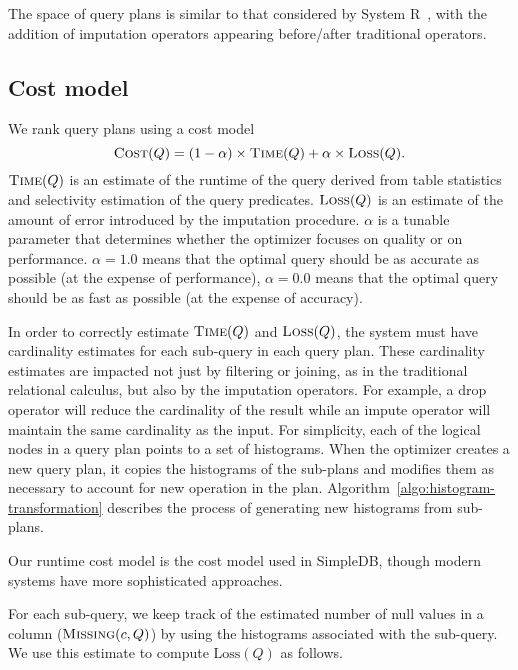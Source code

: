 The space of query plans is similar to that considered by System R~\cite{blasgen1981system}, with the addition of imputation operators appearing before/after traditional operators.

\subsection{Cost model}
\label{sec:cost-model}
We rank query plans using a cost model \[\textsc{Cost}(Q) = (1 - \alpha) \times \textsc{Time}(Q) + \alpha \times \textsc{Loss}(Q).\] $\textsc{Time}(Q)$ is an estimate of the runtime of the query derived from table statistics and selectivity estimation of the query predicates. $\textsc{Loss}(Q)$ is an estimate of the amount of error introduced by the imputation procedure. $\alpha$ is a tunable parameter that determines whether the optimizer focuses on quality or on performance. $\alpha = 1.0$ means that the optimal query should be as accurate as possible (at the expense of performance), $\alpha=0.0$ means that the optimal query should be as fast
as possible (at the expense of accuracy).

In order to correctly estimate $\textsc{Time}(Q)$ and $\textsc{Loss}(Q)$, the system must have cardinality estimates for each sub-query in each query plan.
These cardinality estimates are impacted not just by filtering or joining, as in the traditional relational calculus, but also by the imputation operators.
For example, a drop operator will reduce the cardinality of the result while an impute operator will maintain the same cardinality as the input.
For simplicity, each of the logical nodes in a query plan points to a set of histograms.
When the optimizer creates a new query plan, it copies the histograms of the sub-plans and modifies them as necessary to account for new operation in the plan.
Algorithm~\ref{algo:histogram-transformation} describes the process of generating new histograms from sub-plans.

Our runtime cost model is the cost model used in SimpleDB, though modern systems
have more sophisticated approaches.

For each sub-query, we keep track of the estimated number of
null values in a column  ($\textsc{Missing}(c, Q)$) by using the histograms associated with
the sub-query. We use this estimate to compute
$\text{Loss}(Q)$ as follows.

